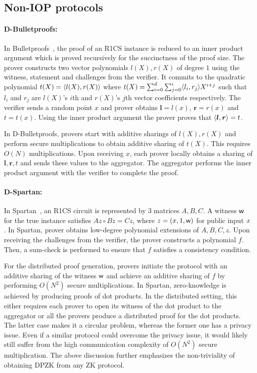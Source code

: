 \subsection{Non-IOP protocols}
\paragraph*{D-Bulletproofs:}
In Bulletproofs~\cite{bulletproofs}, the proof of an R1CS instance is reduced to an inner product argument which is proved recursively for the succinctness of the proof size. 
The prover constructs two vector polynomials $l(X), r(X)$ of degree $1$ using the witness, statement and challenges from the verifier. It commits to the quadratic polynomial $t(X) = \langle l(X),r(X)\rangle$ where $t(X) = \sum_{i=0}^{d} \sum_{j=0}^{i} \langle l_i,r_j\rangle X^{i+j}$ such that $l_i$ and $r_j$ are $l(X)$'s $i$th and $r(X)$'s $j$th vector coefficients respectively.
The verifier sends a random point $x$ and prover obtains ${\bm l} = l(x)$, ${\bm r} = r(x)$ and $t = t(x)$. Using the inner product argument the prover proves that $\langle {\bm l},{\bm r}\rangle = t$.

In D-Bulletproofs, provers start with additive sharings of $l(X), r(X)$ and perform secure multiplications to obtain additive sharing of $t(X)$. This requires $O(N)$ multiplications. Upon receiving $x$, each prover locally obtains a sharing of ${\bm l,\bm r}, t$ and sends these values to the aggregator. The aggregator performs the inner product argument with the verifier to complete the proof.
%

\vspace*{-.3cm}
\paragraph*{D-Spartan:}
In Spartan~\cite{spartan}, an R1CS circuit is represented by 3 matrices $A, B, C$. A witness $\mathsf{w}$ for the true instance satisfies $Az  \circ Bz = Cz$, where $z = ({x}, 1, \mathsf{w})$ for public input ${x}$. In Spartan, prover obtains low-degree polynomial extensions of $A, B, C, z$. Upon receiving the challenges from the verifier, the prover constructs a polynomial $f$. 
Then, a sum-check is performed to ensure that $f$ satisfies a consistency condition.

For the distributed proof generation, provers initiate the protocol with an additive sharing of the witness $\mathsf{w}$ and achieve an additive sharing of $f$ by performing $O(N^2)$ secure multiplications. In Spartan, zero-knowledge is achieved by producing proofs of dot products. In the distributed setting, this either requires each prover to open its witness of the dot product to the aggregator or all the provers produce a distributed proof for the dot products. The latter case makes it a circular problem, whereas the former one has a privacy issue.
Even if a similar protocol could overcome the privacy issue, it would likely still suffer from the high communication complexity of $O(N^2)$ secure multiplication.
The above discussion further emphasizes the non-triviality of obtaining DPZK from any ZK protocol. 

